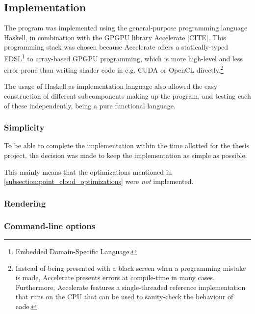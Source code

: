 \documentclass[11pt]{article}
\begin{document}

\subsection{Implementation}
\label{sec:orgb873968}


The program was implemented using the general-purpose programming language Haskell, 
in combination with the GPGPU library Accelerate [CITE].
This programming stack was chosen because Accelerate 
offers a statically-typed EDSL\footnote{Embedded Domain-Specific Language.} to array-based GPGPU programming,
which is more high-level and less error-prone than writing shader code in e.g. CUDA or OpenCL directly.\footnote{Instead of being presented with a black screen when a programming mistake is made, 
Accelerate presents errors at compile-time in many cases. Furthermore, Accelerate features a
single-threaded reference implementation that runs on the CPU that can be used to sanity-check the behaviour of code.}

The usage of Haskell as implementation language also allowed 
the easy construction of different subcomponents making up the program,
and testing each of these independently, being a pure functional language.

\subsubsection{Simplicity}
\label{sec:org8c89bd1}

To be able to complete the implementation within the time allotted for the thesis project,
the decision was made to keep the implementation as simple as possible.

This mainly means that the optimizations mentioned in \autoref{subsection:point_cloud_optimizations} were \emph{not} implemented.


\subsubsection{Rendering}
\label{sec:orgaa58ee4}

\subsubsection{Command-line options}
\label{sec:org59e7717}
\end{document}
